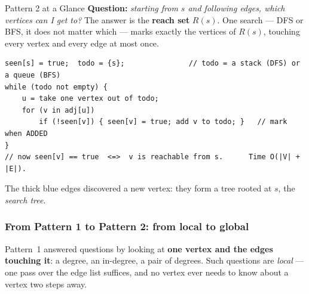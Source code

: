 \begin{patternbox}{Pattern 2 at a Glance}
\textbf{Question:} \emph{starting from $s$ and following edges, which vertices can I get to?} The answer is the \textbf{reach set} $R(s)$. One search --- DFS or BFS, it does not matter which --- marks exactly the vertices of $R(s)$, touching every vertex and every edge at most once.

\begin{center}
\end{center}

\begin{lstlisting}[style=snippet]
seen[s] = true;  todo = {s};               // todo = a stack (DFS) or a queue (BFS)
while (todo not empty) {
    u = take one vertex out of todo;
    for (v in adj[u])
        if (!seen[v]) { seen[v] = true; add v to todo; }   // mark when ADDED
}
// now seen[v] == true  <=>  v is reachable from s.      Time O(|V| + |E|).
\end{lstlisting}
The thick blue edges discovered a new vertex: they form a tree rooted at $s$, the \emph{search tree}.
\end{patternbox}

\subsubsection*{From Pattern 1 to Pattern 2: from local to global}

Pattern~1 answered questions by looking at \textbf{one vertex and the edges touching it}: a degree, an in-degree, a pair of degrees. Such questions are \emph{local} --- one pass over the edge list suffices, and no vertex ever needs to know about a vertex two steps away.

